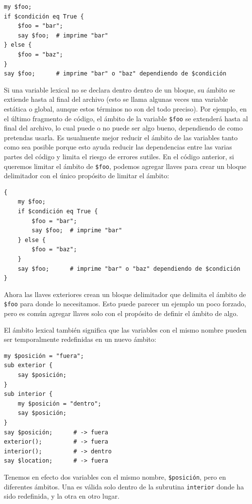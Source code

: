 \begin{lstlisting}
my $foo;
if $condición eq True {
    $foo = "bar";
    say $foo;  # imprime "bar"
} else {
    $foo = "baz";
}
say $foo;      # imprime "bar" o "baz" dependiendo de $condición
\end{lstlisting}
%
Si una variable lexical no se declara dentro dentro de un
bloque, su ámbito se extiende hasta al final del archivo 
(esto se llama algunas veces una variable estática o global, aunque estos términos
no son del todo preciso). Por ejemplo, en el último fragmento de código,
el ámbito de la variable {\tt \$foo} se extenderá hasta al final del 
archivo, lo cual puede o no puede ser algo bueno, dependiendo de
como pretendas usarla. Es usualmente mejor reducir el ámbito de las 
variables tanto como sea posible porque esto ayuda reducir las dependencias
entre las varias partes del código y limita el riesgo de errores sutiles.
En el código anterior, si queremos limitar el ámbito de {\tt \$foo}, podemos
agregar llaves para crear un bloque delimitador con el único propósito de
limitar el ámbito:

\begin{lstlisting}
{
    my $foo;
    if $condición eq True {
        $foo = "bar";
        say $foo;  # imprime "bar"
    } else {
        $foo = "baz";
    }
    say $foo;      # imprime "bar" o "baz" dependiendo de $condición
}
\end{lstlisting}
% 
Ahora las llaves exteriores crean un bloque delimitador que delimita
el ámbito de {\tt \$foo} para donde lo necesitamos. Esto puede parecer
un ejemplo un poco forzado, pero es común agregar llaves solo con el propósito de
definir el ámbito de algo.

El ámbito lexical también significa que las variables con el mismo nombre
pueden ser temporalmente redefinidas en un nuevo ámbito:

\begin{lstlisting}
my $posición = "fuera";
sub exterior {
    say $posición;
}
sub interior {
    my $posición = "dentro";
    say $posición;
}
say $posición;      # -> fuera
exterior();         # -> fuera
interior();         # -> dentro
say $location;      # -> fuera
\end{lstlisting}
% 
Tenemos en efecto dos variables con el mismo nombre,
{\tt \$posición}, pero en diferentes ámbitos. Una es válida solo
dentro de la subrutina {\tt interior} donde ha sido redefinida,
y la otra en otro lugar.

